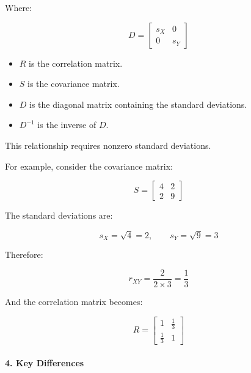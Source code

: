 \documentclass[11pt]{article}
\providecommand{\tightlist}{%
      \setlength{\itemsep}{0pt}\setlength{\parskip}{0pt}}
\begin{document}
Where:

\[
D =
\begin{bmatrix}
s_X & 0 \\
0 & s_Y
\end{bmatrix}
\]

\begin{itemize}
\tightlist
\item
  \(R\) is the correlation matrix.
\item
  \(S\) is the covariance matrix.
\item
  \(D\) is the diagonal matrix containing the standard deviations.
\item
  \(D^{-1}\) is the inverse of \(D\).
\end{itemize}

This relationship requires nonzero standard deviations.

For example, consider the covariance matrix:

\[
S =
\begin{bmatrix}
4 & 2 \\
2 & 9
\end{bmatrix}
\]

The standard deviations are:

\[
s_X=\sqrt{4}=2,
\qquad
s_Y=\sqrt{9}=3
\]

Therefore:

\[
r_{XY}=\frac{2}{2\times3}=\frac{1}{3}
\]

And the correlation matrix becomes:

\[
R =
\begin{bmatrix}
1 & \frac{1}{3} \\
\frac{1}{3} & 1
\end{bmatrix}
\]

\paragraph{4. Key Differences}\label{key-differences}
\end{document}
